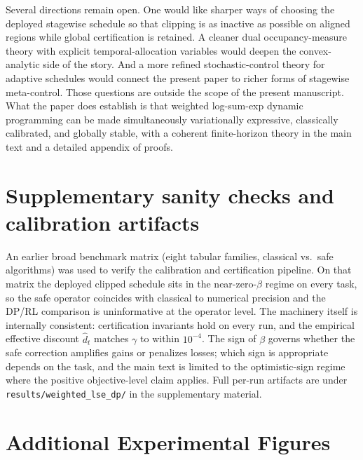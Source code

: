 \documentclass{article}
\theoremstyle{remark}
\begin{document}
Several directions remain open.
One would like sharper ways of choosing the deployed stagewise schedule so that clipping is as inactive as possible on aligned regions while global certification is retained.
A cleaner dual occupancy-measure theory with explicit temporal-allocation variables would deepen the convex-analytic side of the story.
And a more refined stochastic-control theory for adaptive schedules would connect the present paper to richer forms of stagewise meta-control.
Those questions are outside the scope of the present manuscript.
What the paper does establish is that weighted log-sum-exp dynamic programming can be made simultaneously variationally expressive, classically calibrated, and globally stable, with a coherent finite-horizon theory in the main text and a detailed appendix of proofs.

\appendix

\section{Supplementary sanity checks and calibration artifacts}
\label{app:phase_I_IV_sanity}
\label{app:design_diagnostics}

An earlier broad benchmark matrix (eight tabular families, classical
vs.\ safe algorithms) was used to verify the calibration and
certification pipeline. On that matrix the deployed clipped schedule
sits in the near-zero-$\beta$ regime on every task, so the safe
operator coincides with classical to numerical precision and the
DP/RL comparison is uninformative at the operator level. The
machinery itself is internally consistent: certification invariants
hold on every run, and the empirical effective discount
$\hat{d}_t$ matches $\gamma$ to within $10^{-4}$. The sign of $\beta$
governs whether the safe correction amplifies gains or penalizes
losses; which sign is appropriate depends on the task, and the main
text is limited to the optimistic-sign regime where the positive
objective-level claim applies. Full per-run artifacts are under
\texttt{results/weighted\_lse\_dp/} in the supplementary material.

\section{Additional Experimental Figures}
\label{app:exp-figures}
\end{document}
